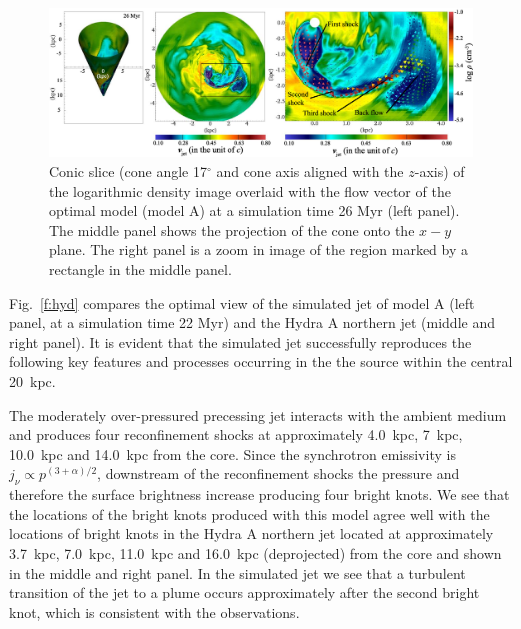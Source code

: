 \begin{figure}
\centering
\includegraphics[width=\textwidth]{fig6.eps}
\caption{ Conic slice (cone angle 17$^{\circ}$ and cone axis aligned with the $z$-axis) of the logarithmic density image overlaid with the flow vector of the optimal model (model A) at a simulation time 26 Myr (left panel). The middle panel shows the projection of the cone onto the $x-y$ plane. The right panel is a zoom in image of the region marked by a rectangle in the middle panel.  }
\label{f:fdir}
\end{figure}

Fig.~\ref{f:hyd} compares the optimal view of the simulated jet of model A (left panel, at a simulation time 22 Myr) and the Hydra A northern jet (middle and right panel). It is evident that the simulated jet successfully reproduces the following key features and processes occurring in the the source within the central 20~kpc. 

The moderately over-pressured precessing jet interacts with the ambient medium and produces four reconfinement shocks at approximately 4.0~kpc, 7~kpc, 10.0~kpc and 14.0~kpc from the core. Since the synchrotron emissivity is $j_{\nu} \propto p^{(3+\alpha)/2}$, downstream of the reconfinement shocks the pressure and therefore the surface brightness increase producing four bright knots. We see that the locations of the bright knots produced with this model agree well with the locations of bright knots in the Hydra A northern jet located at approximately 3.7~kpc, 7.0~kpc, 11.0~kpc and 16.0~kpc (deprojected) from the core and shown in the middle and right panel. In the simulated jet we see that a turbulent transition of the jet to a plume occurs approximately after the second bright knot, which is consistent with the observations.


